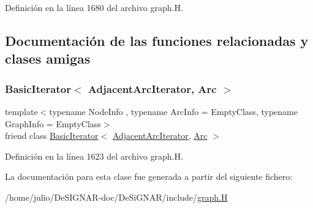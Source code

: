 Definición en la línea 1680 del archivo graph.\+H.



\subsection{Documentación de las funciones relacionadas y clases amigas}
\mbox{\label{class_designar_1_1_graph_1_1_adjacent_arc_iterator_a73ad70d76f3331ee4b07451db1347918}} 
\subsubsection{\texorpdfstring{Basic\+Iterator$<$ Adjacent\+Arc\+Iterator, Arc $>$}{BasicIterator< AdjacentArcIterator, Arc >}}
{\footnotesize\ttfamily template$<$typename Node\+Info , typename Arc\+Info  = Empty\+Class, typename Graph\+Info  = Empty\+Class$>$ \\
friend class \hyperlink{class_designar_1_1_basic_iterator}{Basic\+Iterator}$<$ \hyperlink{class_designar_1_1_graph_1_1_adjacent_arc_iterator}{Adjacent\+Arc\+Iterator}, \hyperlink{class_designar_1_1_graph_a74c730ef4ce2d20f998d72bd25c2b5bf}{Arc} $>$\hspace{0.3cm}{\ttfamily [friend]}}



Definición en la línea 1623 del archivo graph.\+H.



La documentación para esta clase fue generada a partir del siguiente fichero\+:\begin{DoxyCompactItemize}
\item 
/home/julio/\+De\+S\+I\+G\+N\+A\+R-\/doc/\+De\+Si\+G\+N\+A\+R/include/\hyperlink{graph_8_h}{graph.\+H}\end{DoxyCompactItemize}
